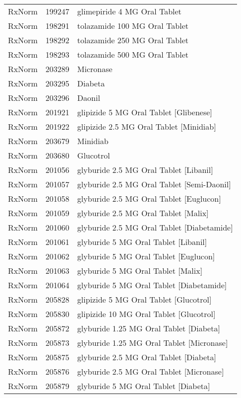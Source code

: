 \begin{longtable}{p{}p{}p{}}
  RxNorm & 199247 & glimepiride 4 MG Oral Tablet \\ 
  RxNorm & 198291 & tolazamide 100 MG Oral Tablet \\ 
  RxNorm & 198292 & tolazamide 250 MG Oral Tablet \\ 
  RxNorm & 198293 & tolazamide 500 MG Oral Tablet \\ 
  RxNorm & 203289 & Micronase \\ 
  RxNorm & 203295 & Diabeta \\ 
  RxNorm & 203296 & Daonil \\ 
  RxNorm & 201921 & glipizide 5 MG Oral Tablet [Glibenese] \\ 
  RxNorm & 201922 & glipizide 2.5 MG Oral Tablet [Minidiab] \\ 
  RxNorm & 203679 & Minidiab \\ 
  RxNorm & 203680 & Glucotrol \\ 
  RxNorm & 201056 & glyburide 2.5 MG Oral Tablet [Libanil] \\ 
  RxNorm & 201057 & glyburide 2.5 MG Oral Tablet [Semi-Daonil] \\ 
  RxNorm & 201058 & glyburide 2.5 MG Oral Tablet [Euglucon] \\ 
  RxNorm & 201059 & glyburide 2.5 MG Oral Tablet [Malix] \\ 
  RxNorm & 201060 & glyburide 2.5 MG Oral Tablet [Diabetamide] \\ 
  RxNorm & 201061 & glyburide 5 MG Oral Tablet [Libanil] \\ 
  RxNorm & 201062 & glyburide 5 MG Oral Tablet [Euglucon] \\ 
  RxNorm & 201063 & glyburide 5 MG Oral Tablet [Malix] \\ 
  RxNorm & 201064 & glyburide 5 MG Oral Tablet [Diabetamide] \\ 
  RxNorm & 205828 & glipizide 5 MG Oral Tablet [Glucotrol] \\ 
  RxNorm & 205830 & glipizide 10 MG Oral Tablet [Glucotrol] \\ 
  RxNorm & 205872 & glyburide 1.25 MG Oral Tablet [Diabeta] \\ 
  RxNorm & 205873 & glyburide 1.25 MG Oral Tablet [Micronase] \\ 
  RxNorm & 205875 & glyburide 2.5 MG Oral Tablet [Diabeta] \\ 
  RxNorm & 205876 & glyburide 2.5 MG Oral Tablet [Micronase] \\ 
  RxNorm & 205879 & glyburide 5 MG Oral Tablet [Diabeta] \\ 

\end{longtable}

